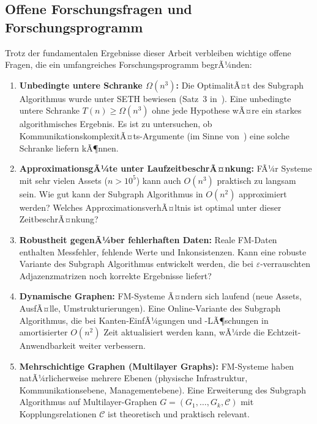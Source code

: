 ﻿\documentclass[a4paper,12pt]{article}
\theoremstyle{definition}
\begin{document}
\subsection{Offene Forschungsfragen und Forschungsprogramm}

Trotz der fundamentalen Ergebnisse dieser Arbeit verbleiben wichtige
offene Fragen, die ein umfangreiches Forschungsprogramm begrÃ¼nden:

\begin{enumerate}

\item \textbf{Unbedingte untere Schranke $\Omega(n^3)$:}
      Die OptimalitÃ¤t des Subgraph Algorithmus wurde unter SETH bewiesen
      (Satz~3 in~\cite{epp2026subgraph}). Eine unbedingte untere Schranke
      $T(n) \geq \Omega(n^3)$ ohne jede Hypothese wÃ¤re ein starkes
      algorithmisches Ergebnis. Es ist zu untersuchen, ob
      KommunikationskomplexitÃ¤ts-Argumente (im Sinne von~\cite{kushilevitz1997})
      eine solche Schranke liefern kÃ¶nnen.

\item \textbf{ApproximationsgÃ¼te unter LaufzeitbeschrÃ¤nkung:}
      FÃ¼r Systeme mit sehr vielen Assets ($n > 10^5$) kann auch $O(n^3)$
      praktisch zu langsam sein. Wie gut kann der Subgraph Algorithmus in
      $O(n^2)$ approximiert werden? Welches ApproximationsverhÃ¤ltnis ist
      optimal unter dieser ZeitbeschrÃ¤nkung?

\item \textbf{Robustheit gegenÃ¼ber fehlerhaften Daten:}
      Reale FM-Daten enthalten Messfehler, fehlende Werte und Inkonsistenzen.
      Kann eine robuste Variante des Subgraph Algorithmus entwickelt werden,
      die bei $\varepsilon$-verrauschten Adjazenzmatrizen noch korrekte
      Ergebnisse liefert?

\item \textbf{Dynamische Graphen:}
      FM-Systeme Ã¤ndern sich laufend (neue Assets, AusfÃ¤lle, Umstrukturierungen).
      Eine Online-Variante des Subgraph Algorithmus, die bei Kanten-EinfÃ¼gungen
      und -LÃ¶schungen in amortisierter $O(n^2)$ Zeit aktualisiert werden kann,
      wÃ¼rde die Echtzeit-Anwendbarkeit weiter verbessern.

\item \textbf{Mehrschichtige Graphen (Multilayer Graphs):}
      FM-Systeme haben natÃ¼rlicher\-weise mehrere Ebenen (physische Infrastruktur,
      Kommunikationsebene, Managementebene). Eine Erweiterung des Subgraph
      Algorithmus auf Multilayer-Graphen $G = (G_1, \ldots, G_k, \mathcal{C})$
      mit Kopplungsrelationen $\mathcal{C}$ ist theoretisch und praktisch relevant.


\end{enumerate}
\end{document}
